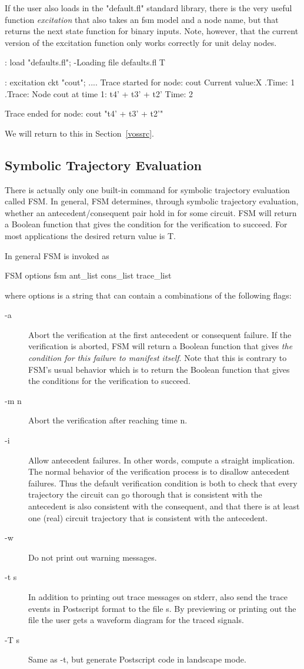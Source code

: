 If the user also loads in the "default.fl" standard library, there is
the very useful function {\em excitation} that also takes an fsm model
and a node name, but that returns the next state function for binary inputs.
Note, however, that the current version of the excitation function
only works correctly for unit delay nodes.
\begin{hol}
: load "defaults.fl";
-Loading file defaults.fl
T

: excitation ckt "cout";
....
Trace started for node: cout 
        Current value:X
.Time: 1
.Trace: Node cout  at time 1: t4' + t3' + t2'
Time: 2

Trace ended for node: cout 
"t4' + t3' + t2'"
\end{hol}
We will return to this in Section~\ref{vossrc}.

\subsection{Symbolic Trajectory Evaluation}

There is actually only one built-in command for symbolic trajectory
evaluation called FSM.
In general, FSM determines, through symbolic trajectory evaluation, whether
an antecedent/consequent pair hold in for some circuit.
FSM will return a Boolean function that gives the condition for the
verification to succeed.
For most applications the desired return value is T.

In general FSM is invoked as
\begin{hol}
FSM options fsm ant_list cons_list trace_list
\end{hol}
where options is a string that can contain a combinations of the
following flags:
\begin{description}
\item[-a] Abort the verification at the first antecedent or consequent failure.
If the verification is aborted, FSM will return a Boolean function that
gives {\em the condition for this failure to manifest itself}.
Note that this is contrary to FSM's usual behavior which is to return
the Boolean function that gives the conditions for the verification to
succeed.
\item [-m n]
Abort the verification after reaching time n.
\item [-i]
Allow antecedent failures.
In other words, compute a straight implication.
The normal behavior of the verification process is to disallow
antecedent failures.
Thus the default verification condition is both to check that every
trajectory the circuit can go thorough that is consistent with the
antecedent is also consistent with the consequent, and that there
is at least one (real) circuit trajectory that is consistent
with the antecedent.
\item[-w]
Do not print out warning messages.
\item[-t s]
In addition to printing out trace messages on stderr, also send
the trace events in Postscript format to the file s.
By previewing or printing out the file the user gets a waveform diagram for
the traced signals.
\item[-T s]
Same as -t, but generate Postscript code in landscape mode.
\end{description}

